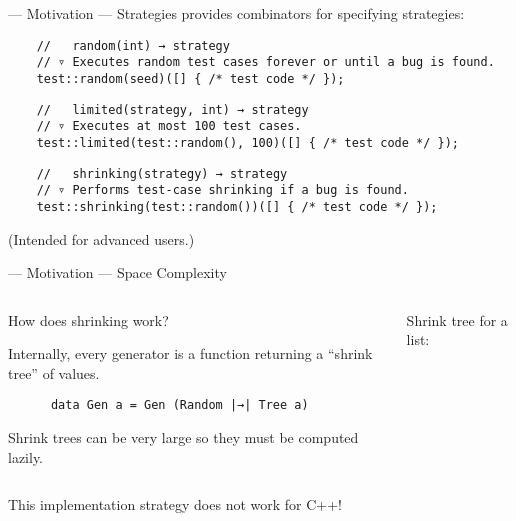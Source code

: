 \begin{frame}[fragile]{\halcheck{} --- Motivation --- Strategies}
  \halcheck{} provides combinators for specifying strategies:

  \begin{verbatim}
    //   random(int) → strategy
    // ▿ Executes random test cases forever or until a bug is found.
    test::random(seed)([] { /* test code */ });
  \end{verbatim}

  \pause{}

  \begin{verbatim}
    //   limited(strategy, int) → strategy
    // ▿ Executes at most 100 test cases.
    test::limited(test::random(), 100)([] { /* test code */ });
  \end{verbatim}

  \pause{}

  \begin{verbatim}
    //   shrinking(strategy) → strategy
    // ▿ Performs test-case shrinking if a bug is found.
    test::shrinking(test::random())([] { /* test code */ });
  \end{verbatim}

  \pause{}

  (Intended for advanced users.)
\end{frame}


\begin{frame}[fragile]{\halcheck{} --- Motivation --- Space Complexity}
  \begin{columns}[t]
    \begin{block}{How does shrinking work?}
      \bigskip

      Internally, every generator is a function returning a ``shrink tree'' of values.

      \bigskip

      \begin{verbatim}
      data Gen a = Gen (Random |→| Tree a)
      \end{verbatim}

      \bigskip

      Shrink trees can be \alert{very large} so they must be computed lazily.
    \end{block}

    \begin{block}{Shrink tree for a list:}
    \end{block}
  \end{columns}

  \pause{}

  This implementation strategy \alert{does not work for C++!}
\end{frame}

